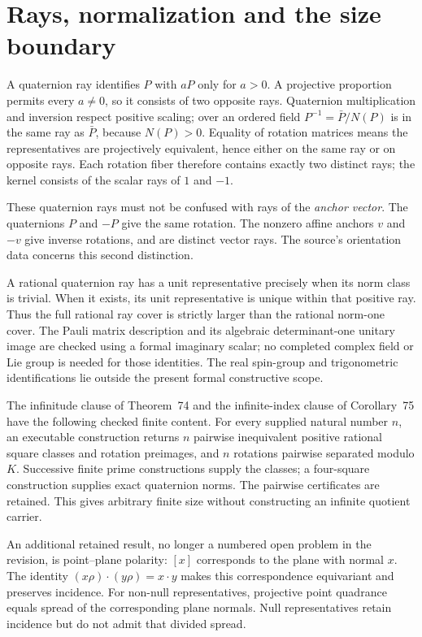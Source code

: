 \documentclass[11pt]{article}
\theoremstyle{remark}
\begin{document}
\section{Rays, normalization and the size boundary}

A quaternion ray identifies \(P\) with \(aP\) only for \(a>0\).
A projective proportion permits every \(a\ne0\), so it consists of two
opposite rays. Quaternion multiplication and inversion respect positive
scaling; over an ordered field \(P^{-1}=\bar P/N(P)\) is in the same ray
as \(\bar P\), because \(N(P)>0\). Equality of rotation matrices means
the representatives are projectively equivalent, hence either on the same
ray or on opposite rays. Each rotation fiber therefore contains exactly two
distinct rays; the kernel consists of the scalar rays of \(1\) and \(-1\).

These quaternion rays must not be confused with rays of the \emph{anchor
vector}. The quaternions \(P\) and \(-P\) give the same rotation. The
nonzero affine anchors \(v\) and \(-v\) give inverse rotations, and are
distinct vector rays. The source's orientation data concerns this second
distinction.

A rational quaternion ray has a unit representative precisely when its norm
class is trivial. When it exists, its unit representative is unique within
that positive ray. Thus the full rational ray cover is strictly larger than
the rational norm-one cover. The Pauli matrix description and its algebraic
determinant-one unitary image are checked using a formal imaginary scalar;
no completed complex field or Lie group is needed for those identities.
The real spin-group and trigonometric identifications lie outside the present
formal constructive scope.

The infinitude clause of Theorem~74 and the infinite-index clause of
Corollary~75 have the following checked finite content. For every supplied
natural number \(n\), an executable construction returns \(n\) pairwise
inequivalent positive rational square classes and rotation preimages, and
\(n\) rotations pairwise separated modulo \(K\). Successive finite prime
constructions supply the classes; a four-square construction supplies exact
quaternion norms. The pairwise certificates are retained. This gives
arbitrary finite size without constructing an infinite quotient carrier.

An additional retained result, no longer a numbered open problem in the
revision, is point--plane polarity: \([x]\) corresponds to the plane with
normal \(x\). The identity
\((x\rho)\cdot(y\rho)=x\cdot y\) makes this correspondence equivariant
and preserves incidence. For non-null representatives, projective point
quadrance equals spread of the corresponding plane normals. Null
representatives retain incidence but do not admit that divided spread.
\end{document}
